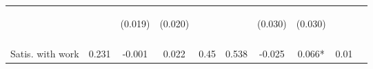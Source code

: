 \begin{table}[h!]
{\begin{tabular}{lccccccccc}
 & \begin{footnotesize}\end{footnotesize} & \begin{footnotesize}(0.019)\end{footnotesize} & \begin{footnotesize}(0.020)\end{footnotesize} & \begin{footnotesize}\end{footnotesize} & \begin{footnotesize}\end{footnotesize} & \begin{footnotesize}(0.030)\end{footnotesize} & \begin{footnotesize}(0.030)\end{footnotesize} & \begin{footnotesize}\end{footnotesize} & \begin{footnotesize}\end{footnotesize}\\
 & \begin{footnotesize}\end{footnotesize} & \begin{footnotesize}[0.032]\end{footnotesize} & \begin{footnotesize}[0.021]\end{footnotesize} & \begin{footnotesize}\end{footnotesize} & \begin{footnotesize}\end{footnotesize} & \begin{footnotesize}[0.753]\end{footnotesize} & \begin{footnotesize}[1.000]\end{footnotesize} & \begin{footnotesize}\end{footnotesize} & \begin{footnotesize}\end{footnotesize}\\
\noalign{\smallskip}Satis. with work & 0.231 & -0.001 & 0.022 & 0.45 & 0.538 & -0.025 & 0.066* & 0.01 & \\

\end{tabular}}
\end{table}
